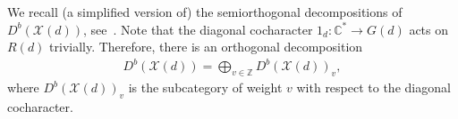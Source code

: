 \documentclass [11pt,oneside,a4paper,mathscr]{amsart}
\newtheorem{thm}{Theorem}[section]
\theoremstyle{definition}
\newtheorem{assum}{Assumption}[section]
\newcommand{\X}{\mathscr{X}}
\newcommand{\dd}{\underline{d}}
\begin{document}
We recall (a simplified version of) the semiorthogonal decompositions 
of $D^b(\X(d))$, see~\cite[Theorem 1.1]{P}. 
Note that the diagonal cocharacter 
$1_d \colon \mathbb{C}^{\ast} \to G(d)$ acts on $R(d)$ trivially. 
Therefore, there is an orthogonal decomposition 
\begin{align*}
    D^b(\X(d))=\bigoplus_{v\in \mathbb{Z}}D^b(\X(d))_v,
\end{align*}
where $D^b(\X(d))_v$ is the subcategory of 
weight $v$ with respect to the diagonal cocharacter. 
%
\end{document}
